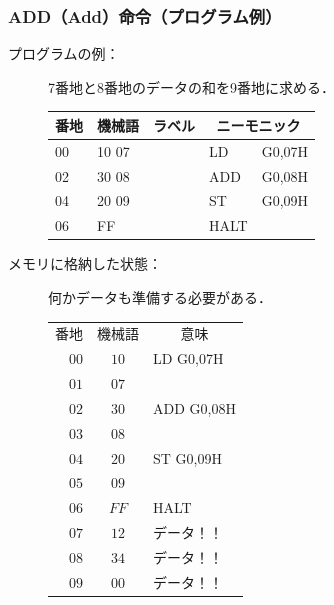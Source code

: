 \documentclass{beamer}                 %
\begin{document}
\begin{frame}
  \frametitle{ADD（Add）命令（プログラム例）}
  \begin{description}
  \item[プログラムの例：]7番地と8番地のデータの和を9番地に求める．\\
    {\ttfamily\small\begin{center}
      \begin{tabular}{|l|l|l|l l|} \hline
        番地 & 機械語 & ラベル & \multicolumn{2}{|c|}{ニーモニック} \\
        \hline
        00 & 10 07 & & LD   & G0,07H \\
        02 & 30 08 & & ADD  & G0,08H \\
        04 & 20 09 & & ST   & G0,09H \\
        06 & FF    & & HALT & \\
        \hline
      \end{tabular}
    \end{center}}
    \vfill

    \item[メモリに格納した状態：] 何かデータも準備する必要がある．
      {\ttfamily\small\begin{center}
        \begin{tabular}{r|c|l}
          \multicolumn{1}{c}{番地} &
          \multicolumn{1}{c}{機械語} &
          \multicolumn{1}{c}{意味} \\
          \cline{2-2}
          $00$ & $10$ & LD G0,07H \\
          \cline{2-2}
          $01$ & $07$ &           \\
          \cline{2-2}
          $02$ & $30$ & ADD G0,08H \\
          \cline{2-2}
          $03$ & $08$ &           \\
          \cline{2-2}
          $04$ & $20$ & ST G0,09H \\
          \cline{2-2}
          $05$ & $09$ &           \\
          \cline{2-2}
          $06$ & $FF$ & HALT      \\
          \cline{2-2}
          $07$ & $12$ & データ！！\\
          \cline{2-2}
          $08$ & $34$ & データ！！\\
          \cline{2-2}
          $09$ & $00$ & データ！！\\
          \cline{2-2}
        \end{tabular}
      \end{center}}
      \vfill

  \end{description}
\end{frame}
\end{document}
